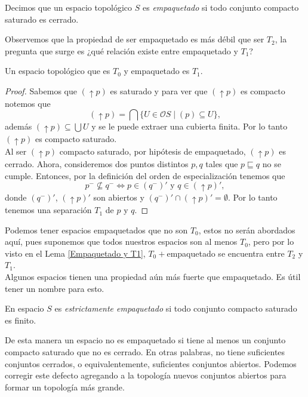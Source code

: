 \begin{dfn}\label{empaquetado}
    Decimos que un espacio topológico $S$ es \emph{empaquetado} si todo conjunto compacto saturado es cerrado. 
\end{dfn}

Observemos que la propiedad de ser empaquetado es más débil que ser $T_2$, la pregunta que surge es ¿qué relación existe entre empaquetado y $T_1$?

\begin{lem}\label{Empaquetado y T1}
    Un espacio topológico que es $T_0$ y empaquetado es $T_1$.
\end{lem}

\begin{proof}
    Sabemos que $(\uparrow p)$ es saturado y para ver que $(\uparrow p)$ es compacto notemos que 
    \[
    (\uparrow p)=\bigcap\{U\in \mathcal{O}S\mid (p)\subseteq U\},
    \]
    además $(\uparrow p)\subseteq \bigcup U$ y se le puede extraer una cubierta finita. Por lo tanto $(\uparrow p)$ es compacto saturado.\\

    Al ser $(\uparrow p)$ compacto saturado, por hipótesis de empaquetado, $(\uparrow p)$ es cerrado. Ahora, consideremos dos puntos distintos $p, q$ tales que $p\sqsubseteq q$ no se cumple. Entonces, por la definición del orden de especialización tenemos que 
    \[
    p^-\nsubseteq q^- \Leftrightarrow p\in (q^-)'\mbox{ y } q\in (\uparrow p)',
    \]
    donde $(q^-)'$, $(\uparrow p)'$ son abiertos y $(q^-)' \cap (\uparrow p)'=\emptyset$. Por lo tanto tenemos una separación $T_1$ de $p$ y $q$.
\end{proof}

Podemos tener espacios empaquetados que no son $T_0$, estos no serán abordados aquí, pues suponemos que todos nuestros espacios son al menos $T_0$, pero por lo visto en el Lema \ref{Empaquetado y T1}, $T_0+$empaquetado se encuentra entre $T_2$ y $T_1$.\\

Algunos espacios tienen una propiedad aún más fuerte que empaquetado. Es útil tener un nombre para esto.

\begin{dfn}
    En espacio $S$ es \emph{estrictamente empaquetado} si todo conjunto compacto saturado es finito. 
\end{dfn}

De esta manera un espacio no es empaquetado si tiene al menos un conjunto compacto saturado que no es cerrado. En otras palabras, no tiene suficientes conjuntos cerrados, o equivalentemente, suficientes conjuntos abiertos. Podemos corregir este defecto agregando a la topología nuevos conjuntos abiertos para formar un topología más grande. \\

